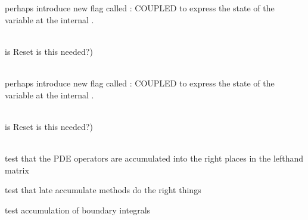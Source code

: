 \begin{DoxyRefList}
\label{todo__todo000103}%
%
perhaps introduce new flag called  \+: COUPLED to express the state of the variable at the internal . 
\item[Member \doxylink{classcsmp_1_1_p_d_e___integrator_a552946a3d9718988a2496b0ea1246631}{csmp\+::PDE\+\_\+\+Integrator\texorpdfstring{$<$}{<} dim, CELLTYPE \texorpdfstring{$>$}{>}\+::Reset} (bool delete\+\_\+math\+\_\+operators=true)]\hfill \\
\label{todo__todo000020}%
%
is Reset is this needed?)  
\item[Member \doxylink{classcsmp_1_1_p_d_e___integrator___c_r_m_a74e11597e95c6259a0ef106f024adb32}{csmp\+::PDE\+\_\+\+Integrator\+\_\+\+CRM\texorpdfstring{$<$}{<} dim, CELLTYPE \texorpdfstring{$>$}{>}\+::Couple\+Domains\+Across\+Split\+Boundary} (\doxylink{classcsmp_1_1_model_sub_domain}{Model\+Sub\+Domain$<$ dim, CELLTYPE $>$} \&)]\hfill \\
\label{todo__todo000105}%
%
perhaps introduce new flag called  \+: COUPLED to express the state of the variable at the internal . 
\item[Member \doxylink{classcsmp_1_1_p_d_e___integrator___c_r_m_a4bc6ec8318281078d40f98825383b354}{csmp\+::PDE\+\_\+\+Integrator\+\_\+\+CRM\texorpdfstring{$<$}{<} dim, CELLTYPE \texorpdfstring{$>$}{>}\+::Reset} (bool delete\+\_\+math\+\_\+operators=true)]\hfill \\
\label{todo__todo000106}%
%
is Reset is this needed?)  
\item[Class \doxylink{classcsmp_1_1_p_d_e___integrator___test}{csmp\+::PDE\+\_\+\+Integrator\+\_\+\+Test} ]\hfill \\
\label{todo__todo000253}%
%
test that the PDE operators are accumulated into the right places in the lefthand matrix 



test that late accumulate methods do the right things 



test accumulation of boundary integrals 




\end{DoxyRefList}
